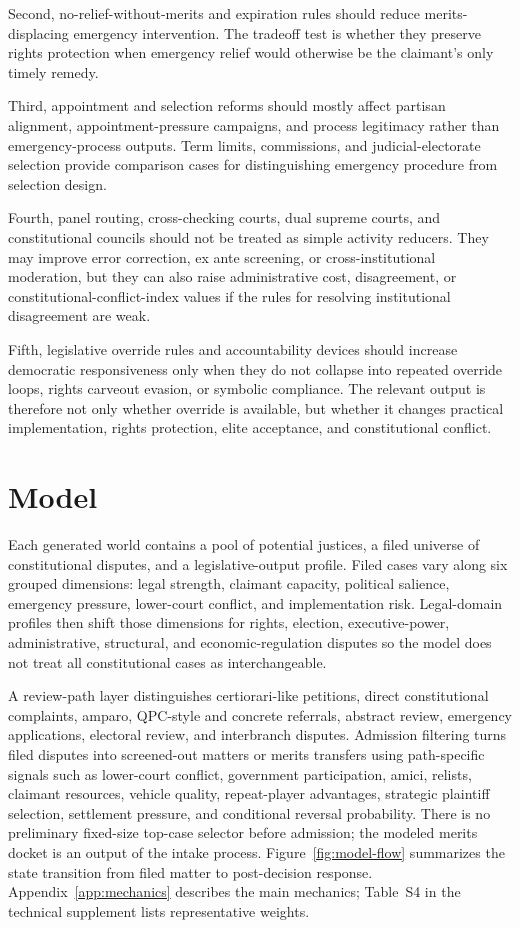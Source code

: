 \documentclass[
    journal=jlc,
    manuscript=research-article,
    year=2026,
  ]{cup-journal}
\begin{document}
Second, no-relief-without-merits and expiration rules should reduce merits-displacing emergency intervention. The tradeoff test is whether they preserve rights protection when emergency relief would otherwise be the claimant's only timely remedy.

Third, appointment and selection reforms should mostly affect partisan alignment, appointment-pressure campaigns, and process legitimacy rather than emergency-process outputs. Term limits, commissions, and judicial-electorate selection provide comparison cases for distinguishing emergency procedure from selection design.

Fourth, panel routing, cross-checking courts, dual supreme courts, and constitutional councils should not be treated as simple activity reducers. They may improve error correction, ex ante screening, or cross-institutional moderation, but they can also raise administrative cost, disagreement, or constitutional-conflict-index values if the rules for resolving institutional disagreement are weak.

Fifth, legislative override rules and accountability devices should increase democratic responsiveness only when they do not collapse into repeated override loops, rights carveout evasion, or symbolic compliance. The relevant output is therefore not only whether override is available, but whether it changes practical implementation, rights protection, elite acceptance, and constitutional conflict.

\section{Model}

Each generated world contains a pool of potential justices, a filed universe of constitutional disputes, and a legislative-output profile. Filed cases vary along six grouped dimensions: legal strength, claimant capacity, political salience, emergency pressure, lower-court conflict, and implementation risk. Legal-domain profiles then shift those dimensions for rights, election, executive-power, administrative, structural, and economic-regulation disputes so the model does not treat all constitutional cases as interchangeable.

A review-path layer distinguishes certiorari-like petitions, direct constitutional complaints, amparo, QPC-style and concrete referrals, abstract review, emergency applications, electoral review, and interbranch disputes. Admission filtering turns filed disputes into screened-out matters or merits transfers using path-specific signals such as lower-court conflict, government participation, amici, relists, claimant resources, vehicle quality, repeat-player advantages, strategic plaintiff selection, settlement pressure, and conditional reversal probability. There is no preliminary fixed-size top-case selector before admission; the modeled merits docket is an output of the intake process. Figure~\ref{fig:model-flow} summarizes the state transition from filed matter to post-decision response. Appendix~\ref{app:mechanics} describes the main mechanics; Table~S4 in the technical supplement lists representative weights.
\end{document}
